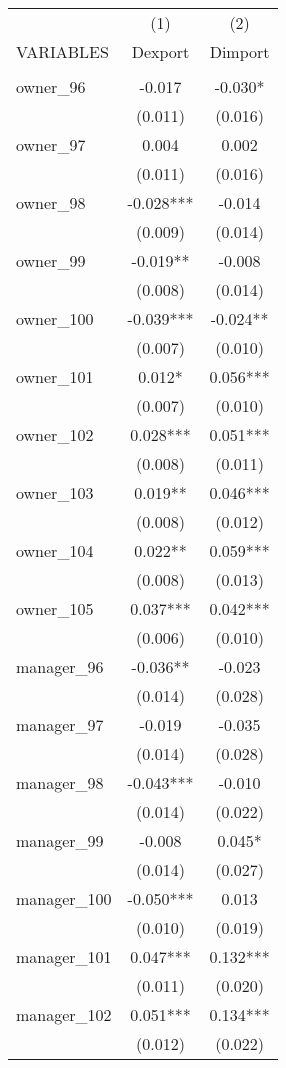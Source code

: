 \begin{tabular}{lcc} \hline
 & (1) & (2) \\
VARIABLES & Dexport & Dimport \\ \hline
 &  &  \\
owner\_96 & -0.017 & -0.030* \\
 & (0.011) & (0.016) \\
owner\_97 & 0.004 & 0.002 \\
 & (0.011) & (0.016) \\
owner\_98 & -0.028*** & -0.014 \\
 & (0.009) & (0.014) \\
owner\_99 & -0.019** & -0.008 \\
 & (0.008) & (0.014) \\
owner\_100 & -0.039*** & -0.024** \\
 & (0.007) & (0.010) \\
owner\_101 & 0.012* & 0.056*** \\
 & (0.007) & (0.010) \\
owner\_102 & 0.028*** & 0.051*** \\
 & (0.008) & (0.011) \\
owner\_103 & 0.019** & 0.046*** \\
 & (0.008) & (0.012) \\
owner\_104 & 0.022** & 0.059*** \\
 & (0.008) & (0.013) \\
owner\_105 & 0.037*** & 0.042*** \\
 & (0.006) & (0.010) \\
manager\_96 & -0.036** & -0.023 \\
 & (0.014) & (0.028) \\
manager\_97 & -0.019 & -0.035 \\
 & (0.014) & (0.028) \\
manager\_98 & -0.043*** & -0.010 \\
 & (0.014) & (0.022) \\
manager\_99 & -0.008 & 0.045* \\
 & (0.014) & (0.027) \\
manager\_100 & -0.050*** & 0.013 \\
 & (0.010) & (0.019) \\
manager\_101 & 0.047*** & 0.132*** \\
 & (0.011) & (0.020) \\
manager\_102 & 0.051*** & 0.134*** \\
 & (0.012) & (0.022) \\

\end{tabular}

